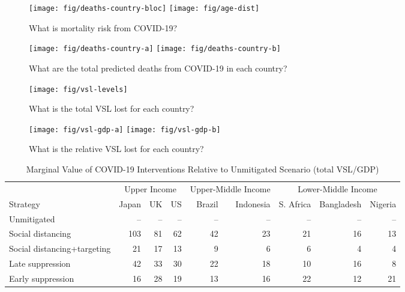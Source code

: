 \documentclass[11pt]{article}
\begin{document}
\clearpage



\begin{figure}[htbp!]
  \centering
  \caption{What is mortality risk from COVID-19?}
  \texttt{[image: fig/deaths-country-bloc]}
    \texttt{[image: fig/age-dist]}
  \label{fig:perc-mortality}
\end{figure}

\begin{figure}[htbp!]
  \centering
  \caption{What are the total predicted deaths from COVID-19 in each country?}
  \texttt{[image: fig/deaths-country-a]}
  \texttt{[image: fig/deaths-country-b]}
  \label{fig:vsl-gdp}
\end{figure}


\begin{figure}[htbp!]
  \centering
  \caption{What is the total VSL lost for each country?}
  \texttt{[image: fig/vsl-levels]}
  \label{fig:vsl-levels}
\end{figure}


\begin{figure}[htbp!]
  \centering
  \caption{What is the relative VSL lost for each country?}
  \texttt{[image: fig/vsl-gdp-a]}
  \texttt{[image: fig/vsl-gdp-b]}
  \label{fig:vsl-gdp}
\end{figure}


\begin{table}
\caption{\label{tab:marginal-value-intervention}Marginal Value of COVID-19 Interventions Relative to Unmitigated Scenario (total VSL/GDP)}
\centering
\begin{tabular}[t]{lrrrrrrrr}
\toprule
\multicolumn{1}{c}{ } & \multicolumn{3}{c}{Upper Income} & \multicolumn{2}{c}{Upper-Middle Income} & \multicolumn{3}{c}{Lower-Middle Income} \\
\cmidrule(l{3pt}r{3pt}){2-4} \cmidrule(l{3pt}r{3pt}){5-6} \cmidrule(l{3pt}r{3pt}){7-9}
Strategy & Japan & UK & US & Brazil & Indonesia & S. Africa & Bangladesh & Nigeria\\
\midrule
Unmitigated & -- & -- & -- & -- & -- & -- & -- & --\\
Social distancing & 103 & 81 & 62 & 42 & 23 & 21 & 16 & 13\\
Social distancing+targeting & 21 & 17 & 13 & 9 & 6 & 6 & 4 & 4\\
Late suppression & 42 & 33 & 30 & 22 & 18 & 10 & 16 & 8\\
Early suppression & 16 & 28 & 19 & 13 & 16 & 22 & 12 & 21\\
\bottomrule
\end{tabular}
\end{table}
\end{document}
